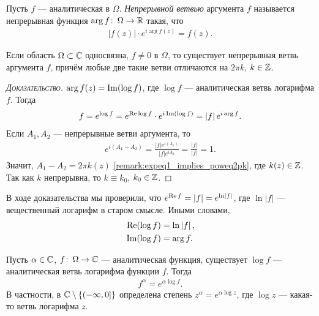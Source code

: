 \documentclass[../complex-analysis.tex]{subfiles}
\begin{document}
\begin{df}
 Пусть $ f $ --- аналитическая в $ \Omega $. \textit{Непрерывной ветвью} аргумента $ f $ называется непрерывная функция $ \arg f \colon\, \Omega \to \mathbb{R} $ такая, что
 \begin{align*}
  \left| f(z) \right| \cdot e^{i \arg f(z)} = f(z).
 \end{align*}
\end{df}
\begin{thm}
 Если область $ \Omega \subset \mathbb{C}  $ односвязна, $ f \neq 0 $ в $ \Omega $, то существует непрерывная ветвь аргумента $ f $, причём любые две такие ветви отличаются на $ 2\pi k $, $ k \in \mathbb{Z} $.
\end{thm}
\begin{proof}[\normalfont\textsc{Доказательство}]
 $ \arg f(z) = \operatorname{Im} (\log f) $, где $ \log f $ --- аналитическая ветвь логарифма $ f $. Тогда
 \begin{align*}
 f = e^{\log f} = e^{\operatorname{Re} \log f} \cdot e^{i \operatorname{Im} (\log f)} = \left| f \right| e^{i \arg f}.
 \end{align*} Если $ A_1, A_2 $ --- непрерывные ветви аргумента, то
 \begin{align*}
  e^{i(A_1 - A_2)} = \frac{\left| f \right|e^{i(A_1)}}{\left| f \right|e^{iA_2}} = \frac{\left| f \right|}{\left| f \right|} = 1.
\end{align*} Значит, $ A_1 - A_2 = 2\pi k(z) $ \eqref{remark:expeq1_implies_poweq2pk}, где $ k(z) \in \mathbb{Z} $. Так как $ k $ непрерывна, то $ k \equiv k_0 $, $ k_0 \in \mathbb{Z} $.
\end{proof}
\begin{remrk}
 В ходе доказательства мы проверили, что $ e^{\operatorname{Re} f} = \left| f \right| = e^{\ln \left| f \right|} $, где $ \ln \left| f \right| $ --- вещественный логарифм в старом смысле. Иными словами,
 \begin{align*}
  \operatorname{Re} (\log f) &= \ln \left| f \right|, \\
  \operatorname{Im} (\log f) &= \arg f.
 \end{align*}
\end{remrk}

\begin{df}
 Пусть $ \alpha \in\mathbb{C} $, $ f \colon\, \Omega \to \mathbb{C}   $ --- аналитическая функция, существует $ \log f $  --- аналитическая ветвь логарифма функции $ f $. Тогда
 \begin{align*}
  f^{\alpha} = e^{\alpha \log f}.
 \end{align*} В частности, в $ \mathbb{C} \setminus \left\{ \left(-\infty, 0\right]   \right\} $  определена степень $ z^{\alpha} = e^{\alpha \log z} $, где $ \log z $ --- какая-то ветвь логарифма $ z $.
\end{df}
\end{document}
